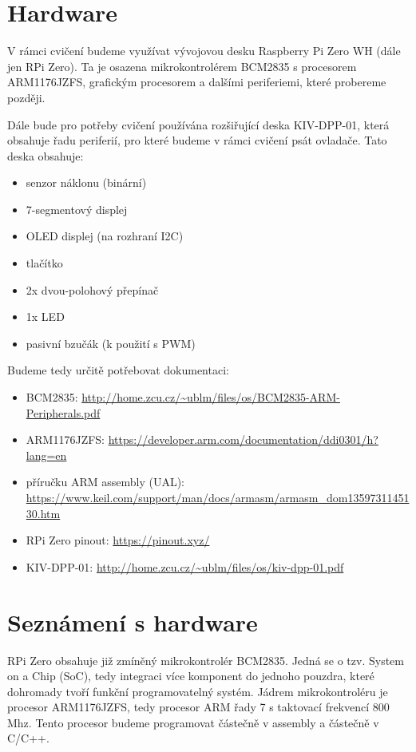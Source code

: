 \documentclass{article}
\begin{document}
\section{Hardware}

V rámci cvičení budeme využívat vývojovou desku Raspberry Pi Zero WH (dále jen RPi Zero). Ta je osazena mikrokontrolérem BCM2835 s procesorem ARM1176JZFS, grafickým procesorem a dalšími periferiemi, které probereme později.

Dále bude pro potřeby cvičení používána rozšiřující deska KIV-DPP-01, která obsahuje řadu periferií, pro které budeme v rámci cvičení psát ovladače. Tato deska obsahuje:\\
\begin{itemize}
	\item senzor náklonu (binární)
	\item 7-segmentový displej
	\item OLED displej (na rozhraní I2C)
	\item tlačítko
	\item 2x dvou-polohový přepínač
	\item 1x LED
	\item pasivní bzučák (k použití s PWM)
\end{itemize}
Budeme tedy určitě potřebovat dokumentaci:

\begin{itemize}
	\item BCM2835: \url{http://home.zcu.cz/~ublm/files/os/BCM2835-ARM-Peripherals.pdf}
	\item ARM1176JZFS: \url{https://developer.arm.com/documentation/ddi0301/h?lang=en}
	\item příručku ARM assembly (UAL): \url{https://www.keil.com/support/man/docs/armasm/armasm_dom1359731145130.htm}
	\item RPi Zero pinout: \url{https://pinout.xyz/}
	\item KIV-DPP-01: \url{http://home.zcu.cz/~ublm/files/os/kiv-dpp-01.pdf}
\end{itemize}

\section{Seznámení s hardware}

RPi Zero obsahuje již zmíněný mikrokontrolér BCM2835. Jedná se o tzv. System on a Chip (SoC), tedy integraci více komponent do jednoho pouzdra, které dohromady tvoří funkční programovatelný systém. Jádrem mikrokontroléru je procesor ARM1176JZFS, tedy procesor ARM řady 7 s taktovací frekvencí 800 Mhz. Tento procesor budeme programovat částečně v assembly a částečně v C/C++.
\end{document}

